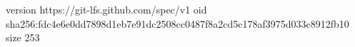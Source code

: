 version https://git-lfs.github.com/spec/v1
oid sha256:fdc4e6e0dd7898d1eb7e91dc2508cc0487f8a2cd5c178af3975d033c8912fb10
size 253

